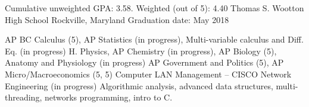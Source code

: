 

\begin{cventries}

  \cventry %
    {Cumulative unweighted GPA: 3.58. Weighted (out of 5): 4.40} %
    {Thomas S. Wootton High School} %
    {Rockville, Maryland} %
    {Graduation date: May 2018} %
    {
    \begin{cvsklist}
    	{ AP BC Calculus (5), AP Statistics (in progress), Multi-variable calculus and Diff. Eq. (in progress)}
        {H. Physics, AP Chemistry (in progress), AP Biology (5), Anatomy and Physiology (in progress)}
        {AP Government and Politics (5), AP Micro/Macroeconomics (5, 5)}
        {Computer LAN Management – CISCO Network Engineering (in progress)}
        {Algorithmic analysis, advanced data structures, multi-threading, networks programming, intro to C.}
    \end{cvsklist}
    }

\end{cventries}
